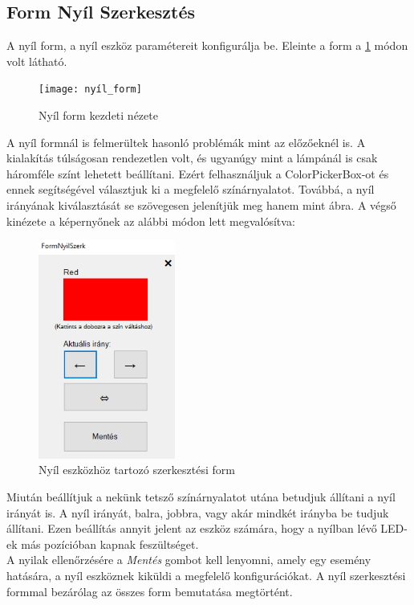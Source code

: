 \documentclass[tocnopagenum]{thesis-ekf}
\theoremstyle{definition}
\theoremstyle{remark}
\begin{document}
	\subsection{Form Nyíl Szerkesztés}
	A nyíl form, a nyíl eszköz paramétereit konfigurálja be. Eleinte a form a \ref{fig:nyilformKezd} módon volt látható.
	\begin{figure}[h!]	
		\centering
		\texttt{[image: nyíl\_form]}
		\caption[Nyíl form kezdeti nézete]{Nyíl form kezdeti nézete}
		\label{fig:nyilformKezd}
	\end{figure}
	A nyíl formnál is felmerültek hasonló problémák mint az előzőeknél is. A kialakítás túlságosan rendezetlen volt, és ugyanúgy mint a lámpánál is csak háromféle színt lehetett beállítani.
	Ezért felhasználjuk a ColorPickerBox-ot és ennek segítségével választjuk ki a megfelelő színárnyalatot. Továbbá, a nyíl irányának kiválasztását se szövegesen jelenítjük meg hanem mint ábra.
	A végső kinézete a képernyőnek az alábbi módon lett megvalósítva:
		\begin{figure}[h!]	
		\centering
		\includegraphics[page=1,width=0.4\textwidth]{nyilSzerk}
		\caption[Nyíl eszközhöz szerkesztési form]{Nyíl eszközhöz tartozó szerkesztési form}
		\label{fig:nyilformveg}
	\end{figure}
	Miután beállítjuk a nekünk tetsző színárnyalatot utána betudjuk állítani a nyíl irányát is.
	A nyíl irányát, balra, jobbra, vagy akár mindkét irányba be tudjuk állítani.
	Ezen beállítás annyit jelent az eszköz számára, hogy a nyílban lévő LED-ek más pozícióban kapnak feszültséget.
	\\
	A nyilak ellenőrzésére a \textit{Mentés} gombot kell lenyomni, amely egy esemény hatására, a nyíl eszköznek kiküldi a megfelelő konfigurációkat.
	A nyíl szerkesztési formmal bezárólag az összes form bemutatása megtörtént.
\end{document}
